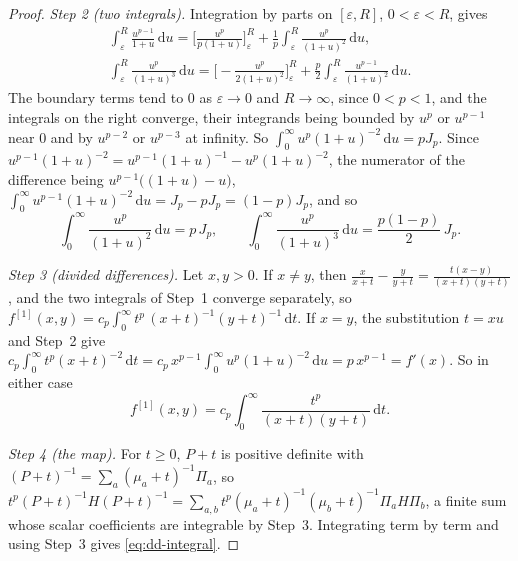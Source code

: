 \begin{proof}
\emph{Step 2 (two integrals).} Integration by parts on $[\varepsilon,R]$,
$0<\varepsilon<R$, gives
\begin{gather*}
  \int_{\varepsilon}^{R}\frac{u^{p-1}}{1+u}\,\mathrm du
  =\Big[\frac{u^{p}}{p(1+u)}\Big]_{\varepsilon}^{R}
  +\frac1p\int_{\varepsilon}^{R}\frac{u^{p}}{(1+u)^{2}}\,\mathrm du,\\
  \int_{\varepsilon}^{R}\frac{u^{p}}{(1+u)^{3}}\,\mathrm du
  =\Big[-\frac{u^{p}}{2(1+u)^{2}}\Big]_{\varepsilon}^{R}
  +\frac p2\int_{\varepsilon}^{R}\frac{u^{p-1}}{(1+u)^{2}}\,\mathrm du .
\end{gather*}
The boundary terms tend to $0$ as $\varepsilon\to0$ and $R\to\infty$, since
$0<p<1$, and the integrals on the right converge, their integrands being
bounded by $u^{p}$ or $u^{p-1}$ near $0$ and by $u^{p-2}$ or $u^{p-3}$ at
infinity. So $\int_0^{\infty}u^{p}(1+u)^{-2}\,\mathrm du=pJ_p$. Since
$u^{p-1}(1+u)^{-2}=u^{p-1}(1+u)^{-1}-u^{p}(1+u)^{-2}$, the numerator of the
difference being $u^{p-1}\big((1+u)-u\big)$,
$\int_0^{\infty}u^{p-1}(1+u)^{-2}\,\mathrm du=J_p-pJ_p=(1-p)J_p$, and so
\begin{equation*}
  \int_0^{\infty}\frac{u^{p}}{(1+u)^{2}}\,\mathrm du=p\,J_p,
  \qquad
  \int_0^{\infty}\frac{u^{p}}{(1+u)^{3}}\,\mathrm du
  =\frac{p(1-p)}{2}\,J_p .
\end{equation*}

\emph{Step 3 (divided differences).} Let $x,y>0$. If $x\ne y$, then
$\frac{x}{x+t}-\frac{y}{y+t}=\frac{t(x-y)}{(x+t)(y+t)}$, and the two
integrals of Step~1 converge separately, so
$f^{[1]}(x,y)=c_p\int_0^{\infty}t^{p}\,(x+t)^{-1}(y+t)^{-1}\,\mathrm dt$.
If $x=y$, the substitution $t=xu$ and Step~2 give
$c_p\int_0^{\infty}t^{p}(x+t)^{-2}\,\mathrm dt
=c_p\,x^{p-1}\int_0^{\infty}u^{p}(1+u)^{-2}\,\mathrm du=p\,x^{p-1}=f'(x)$.
So in either case
\begin{equation*}
  f^{[1]}(x,y)=c_p\int_0^{\infty}\frac{t^{p}}{(x+t)(y+t)}\,\mathrm dt .
\end{equation*}

\emph{Step 4 (the map).} For $t\ge0$, $P+t$ is positive definite with
$(P+t)^{-1}=\sum_a(\mu_a+t)^{-1}\Pi_a$, so
$t^{p}(P+t)^{-1}H(P+t)^{-1}=\sum_{a,b}t^{p}(\mu_a+t)^{-1}(\mu_b+t)^{-1}
\Pi_aH\Pi_b$, a finite sum whose scalar coefficients are integrable by
Step~3. Integrating term by term and using Step~3 gives
\eqref{eq:dd-integral}.


\end{proof}
